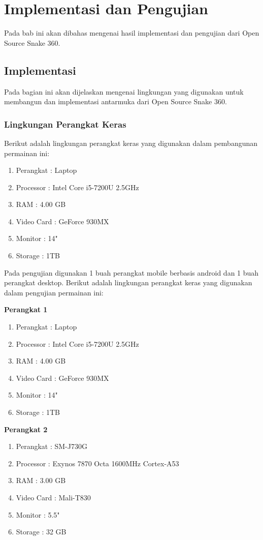 \chapter{Implementasi dan Pengujian}
\label{chap:implementasipengujian}

Pada bab ini akan dibahas mengenai hasil implementasi dan pengujian dari Open Source Snake 360.

\section{Implementasi}
Pada bagian ini akan dijelaskan mengenai lingkungan yang digunakan untuk membangun dan implementasi antarmuka dari Open Source Snake 360.

\subsection{Lingkungan Perangkat Keras}
Berikut adalah lingkungan perangkat keras yang digunakan dalam pembangunan permainan ini: 

\begin{enumerate}
	\item Perangkat : Laptop
	\item Processor : Intel Core i5-7200U 2.5GHz
	\item RAM : 4.00 GB
	\item Video Card : GeForce 930MX
	\item Monitor : 14"
	\item Storage : 1TB
\end{enumerate}

Pada pengujian digunakan 1 buah perangkat mobile berbasis android dan 1 buah perangkat desktop. Berikut adalah lingkungan perangkat keras yang digunakan dalam pengujian permainan ini:

\textbf{Perangkat 1}\\
\begin{enumerate}
	\item Perangkat : Laptop
	\item Processor : Intel Core i5-7200U 2.5GHz
	\item RAM : 4.00 GB
	\item Video Card : GeForce 930MX
	\item Monitor : 14"
	\item Storage : 1TB
\end{enumerate}

\textbf{Perangkat 2}\\
\begin{enumerate}
	\item Perangkat : SM-J730G
	\item Processor : Exynos 7870 Octa 1600MHz Cortex-A53
	\item RAM : 3.00 GB
	\item Video Card : Mali-T830
	\item Monitor : 5.5"
	\item Storage : 32 GB
\end{enumerate}

